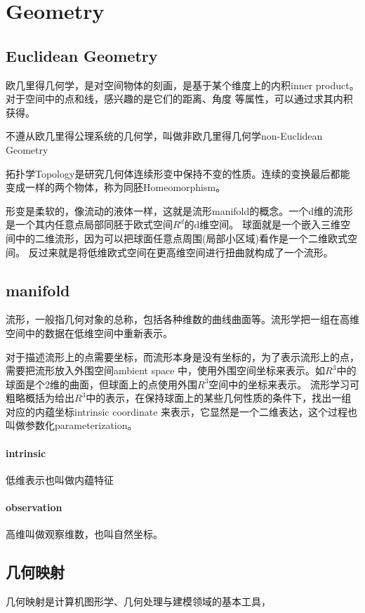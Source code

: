 \section{Geometry}

\subsection{Euclidean Geometry}
欧几里得几何学，是对空间物体的刻画，是基于某个维度上的内积inner product。对于空间中的点和线，感兴趣的是它们的距离、角度
等属性，可以通过求其内积获得。

不遵从欧几里得公理系统的几何学，叫做非欧几里得几何学non-Euclidean Geometry

拓扑学Topology是研究几何体连续形变中保持不变的性质。连续的变换最后都能变成一样的两个物体，称为同胚Homeomorphism。

形变是柔软的，像流动的液体一样，这就是流形manifold的概念。一个d维的流形是一个其内任意点局部同胚于欧式空间$R^d$的d维空间。
球面就是一个嵌入三维空间中的二维流形，因为可以把球面任意点周围(局部小区域)看作是一个二维欧式空间。
反过来就是将低维欧式空间在更高维空间进行扭曲就构成了一个流形。

\subsection{manifold}

流形，一般指几何对象的总称，包括各种维数的曲线曲面等。流形学把一组在高维空间中的数据在低维空间中重新表示。

对于描述流形上的点需要坐标，而流形本身是没有坐标的，为了表示流形上的点，需要把流形放入外围空间ambient space
中，使用外围空间坐标来表示。如$R^3$中的球面是个2维的曲面，但球面上的点使用外围$R^3$空间中的坐标来表示。
流形学习可粗略概括为给出$R^3$中的表示，在保持球面上的某些几何性质的条件下，找出一组对应的内蕴坐标intrinsic coordinate 
来表示，它显然是一个二维表达，这个过程也叫做参数化parameterization。

\paragraph{intrinsic}
低维表示也叫做内蕴特征

\paragraph{observation}
高维叫做观察维数，也叫自然坐标。

\subsection{几何映射}
几何映射是计算机图形学、几何处理与建模领域的基本工具，

